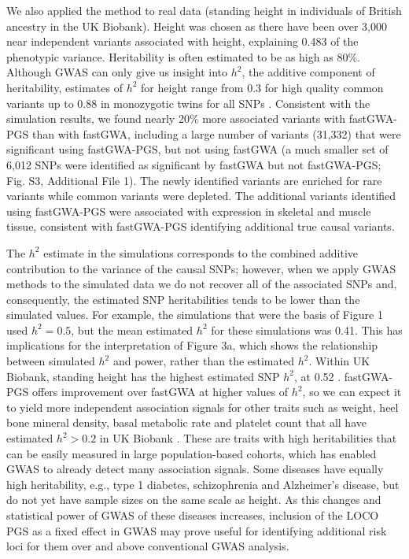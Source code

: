 \documentclass[fleqn,10pt]{wlscirep}
\begin{document}
We also applied the method to real data (standing height in individuals of British ancestry in the UK Biobank). Height was chosen as there have been over 3,000 near independent variants associated with height, explaining 0.483 of the phenotypic variance. Heritability is often estimated to be as high as 80\%. Although GWAS can only give us insight into $h^2$, the additive component of heritability, estimates of $h^2$ for height range from 0.3 for high quality common variants up to 0.88 in monozygotic twins for all SNPs \cite{yengo2018meta,hou2019accurate,nolte2017comparison}. Consistent with the simulation results, we found nearly 20\% more associated variants with fastGWA-PGS than with fastGWA, including a large number of variants (31,332) that were significant using fastGWA-PGS, but not using fastGWA (a much smaller set of 6,012 SNPs were identified as significant by fastGWA but not fastGWA-PGS; Fig. S3, Additional File 1). The newly identified variants are enriched for rare variants while common variants were depleted. The additional variants identified using fastGWA-PGS were associated with expression in skeletal and muscle tissue, consistent with fastGWA-PGS identifying additional true causal variants.  

The $h^2$ estimate in the simulations corresponds to the combined additive contribution to the variance of the causal SNPs; however, when we apply GWAS methods to the simulated data we do not recover all of the associated SNPs and, consequently, the estimated SNP heritabilities tends to be lower than the simulated values. For example, the simulations that were the basis of Figure 1 used $h^2 = 0.5$, but the mean estimated $h^2$ for these simulations was 0.41. This has implications for the interpretation of Figure 3a, which shows the relationship between simulated $h^2$ and power, rather than the estimated $h^2$.  Within UK Biobank, standing height has the highest estimated SNP $h^2$, at 0.52 \cite{jiang2019resource}.  fastGWA-PGS offers improvement over fastGWA at higher values of $h^2$, so we can expect it to yield more independent association signals for other traits such as weight, heel bone mineral density, basal metabolic rate and platelet count that all have estimated $h^2 > 0.2$ in UK Biobank \cite{jiang2019resource,watanabe2019global}. These are traits with high heritabilities that can be easily measured in large population-based cohorts, which has enabled GWAS to already detect many association signals. Some diseases have equally high heritability, e.g., type 1 diabetes, schizophrenia and Alzheimer’s disease, but do not yet have sample sizes on the same scale as height. As this changes and statistical power of GWAS of these diseases increases, inclusion of the LOCO PGS as a fixed effect in GWAS may prove useful for identifying additional risk loci for them over and above conventional GWAS analysis. 
\end{document}
